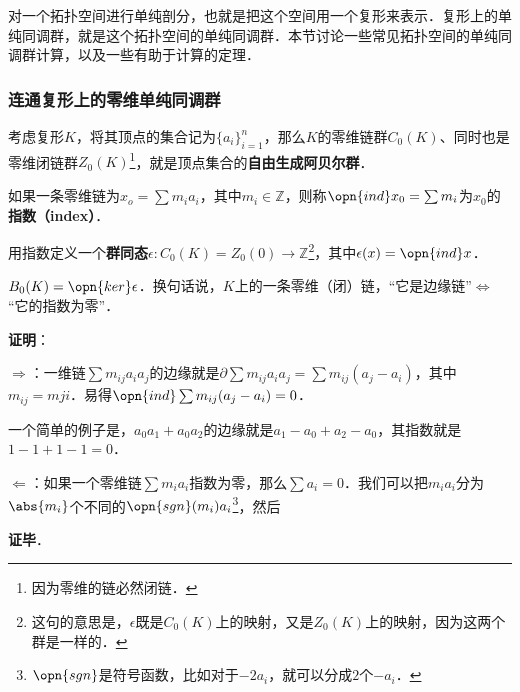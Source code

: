 

对一个拓扑空间进行单纯剖分，也就是把这个空间用一个复形来表示．复形上的单纯同调群，就是这个拓扑空间的单纯同调群．本节讨论一些常见拓扑空间的单纯同调群计算，以及一些有助于计算的定理．

\subsubsection{连通复形上的零维单纯同调群}

考虑复形$K$，将其顶点的集合记为$\{a_i\}_{i=1}^n$，那么$K$的零维链群$C_0(K)$、同时也是零维闭链群$Z_0(K)$\footnote{因为零维的链必然闭链．}，就是顶点集合的\textbf{自由生成阿贝尔群}．

如果一条零维链为$x_o=\sum m_ia_i$，其中$m_i\in\mathbb{Z}$，则称$\opn{ind} x_0=\sum m_i$为$x_0$的\textbf{指数（index）}．

用指数定义一个\textbf{群同态}$\epsilon: C_0(K)=Z_0(0)\to\mathbb{Z}$\footnote{这句的意思是，$\epsilon$既是$C_0(K)$上的映射，又是$Z_0(K)$上的映射，因为这两个群是一样的．}，其中$\epsilon(x)=\opn{ind} x$．

\begin{lemma}{}
$B_0(K)=\opn{ker}\epsilon$．换句话说，$K$上的一条零维（闭）链，“它是边缘链”$\iff$“它的指数为零”．
\end{lemma}

\textbf{证明}：

$\Rightarrow$：一维链$\sum m_{ij}a_ia_j$的边缘就是$\partial\sum m_{ij}a_ia_j=\sum m_{ij}(a_j-a_i)$，其中$m_{ij}=m{ji}$．易得$\opn{ind}\sum m_{ij}(a_j-a_i)=0$．

一个简单的例子是，$a_0a_1+a_0a_2$的边缘就是$a_1-a_0+a_2-a_0$，其指数就是$1-1+1-1=0$．


$\Leftarrow$：如果一个零维链$\sum m_ia_i$指数为零，那么$\sum a_i=0$．我们可以把$m_ia_i$分为$\abs{m_i}$个不同的$\opn{sgn}(m_i)a_i$\footnote{$\opn{sgn}$是符号函数，比如对于$-2a_i$，就可以分成$2$个$-a_i$．}，然后

\textbf{证毕}．













